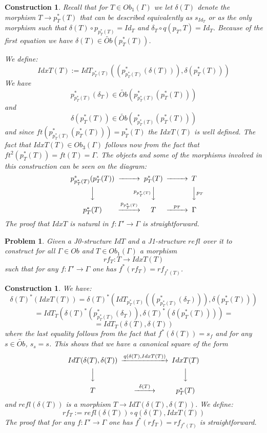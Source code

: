\documentclass[12pt]{article}
\newenvironment{eq}{\begin{equation}}{\end{equation}}
\newtheorem{problem}[proposition]{Problem}
\newtheorem{construction}[proposition]{Construction}
\newcommand{\llabel}[1]{\label{#1}}
\newcommand{\sr}{\rightarrow}
\newcommand{\wt}{\widetilde}
\begin{document}
\begin{construction}
\llabel{2015.03.27.constr1}\rm
Recall that for $T\in Ob_1(\Gamma)$ we let $\delta(T)$ denote the morphism $T\sr p_T^*(T)$ that can be described equivalently as $s_{Id_T}$ or as the only morphism such that $\delta(T)\circ p_{p_T^*(T)}=Id_T$ and $\delta_T\circ q(p_T,T)=Id_T$. Because of the first equation we have $\delta(T)\in \wt{Ob}(p_T^*(T))$. 

We define:
%
\begin{eq}
\llabel{2015.04.06.eq1}
IdxT(T):=IdT_{p_T^*(T)}((p_{p_T^*(T)}^*(\delta(T))), \delta(p_T^*(T)))
\end{eq}
%
We have
%
$$p_{p_T^*(T)}^*(\delta_T)\in \wt{Ob}(p_{p_T^*(T)}^*(p_T^*(T)))$$
%
and 
%
$$\delta(p_T^*(T))\in \wt{Ob}(p_{p_T^*(T)}^*(p_T^*(T)))$$
%
and since $ft(p_{p_T^*(T)}^*(p_T^*(T)))=p_T^*(T)$ the $IdxT(T)$ is well defined. The fact that $IdxT(T)\in Ob_3(\Gamma)$ follows now from the fact that $ft^2(p_T^*(T))=ft(T)=\Gamma$. The objects and some of the morphisms involved in this construction can be seen on the diagram: 
%
$$
\begin{CD}
p_{p_T^*(T)}^*(p_T^*(T)) @>>> p_T^*(T) @>>> T\\
@VVV @Vp_{p_T^*(T)} VV @VV p_TV\\
p_T^*(T) @>p_{p_T^*(T)}>> T @>p_T>> \Gamma
\end{CD}
$$
%
The proof that $IdxT$ is natural in $f:\Gamma'\sr \Gamma$ is straightforward.
\end{construction}
%
%
\begin{problem}
\llabel{2015.03.27.prob2}
Given a J0-structure $IdT$ and a J1-structure $refl$ over it to construct for all $\Gamma\in Ob$ and $T\in Ob_1(\Gamma)$ a morphism 
%
$$rf_T:T\sr IdxT(T)$$
%
such that for any $f:\Gamma'\sr \Gamma$ one has $f^*(rf_T)=rf_{f^*(T)}$. 
\end{problem}
%
\begin{construction}
\llabel{2015.03.27.constr2}\rm
We have:
%
$$\delta(T)^*(IdxT(T))=\delta(T)^*(IdT_{p_T^*(T)}((p_{p_T^*(T)}^*(\delta_T))),\delta(p_T^*(T)))$$
$$=IdT_T(\delta(T)^*(p_{p_T^*(T)}^*(\delta_T)),\delta(T)^*(\delta(p_T^*(T))))=$$
$$=IdT_T(\delta(T),\delta(T))$$
%
where the last equality follows from the fact that $f^*(\delta(T))=s_f$ and for any $s\in\wt{Ob}$, $s_s=s$.  This shows that we have a canonical square of the form
%
\begin{eq}
\llabel{2015.03.31.eq3}
\begin{CD}
IdT(\delta(T),\delta(T)) @>q(\delta(T),IdxT(T))>> IdxT(T)\\
@VVV @VVV\\
T @>\delta(T)>> p_T^*(T)
\end{CD}
\end{eq}
%
and $refl(\delta(T))$ is a morphism $T\sr IdT(\delta(T),\delta(T))$. We define:
%
\begin{eq}
\llabel{2015.04.02.eq1}
rf_T:=refl(\delta(T))\circ q(\delta(T),IdxT(T))
\end{eq}
%
The proof that for any $f:\Gamma'\sr \Gamma$ one has $f^*(rf_T)=rf_{f^*(T)}$ is straightforward. 
\end{construction}
\end{document}
